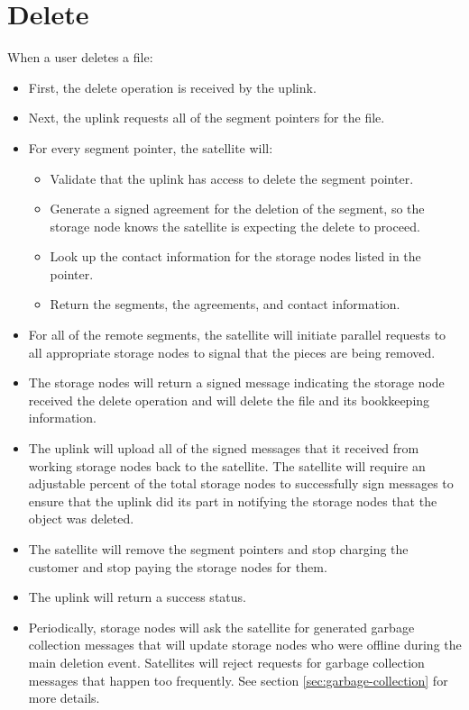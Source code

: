 \documentclass[11pt,fleqn,openany]{book}
\begin{document}
\section{Delete}

When a user deletes a file:

\begin{itemize}
\item First, the delete operation is received by the uplink.
\item Next, the uplink requests all of the segment pointers for the file.
\item For every segment pointer, the satellite will:
  \begin{itemize}
  \item Validate that the uplink has access to delete the segment pointer.
  \item Generate a signed agreement for the deletion of the segment, so the
    storage node knows the satellite is expecting the delete to proceed.
  \item Look up the contact information for the storage nodes listed in the
  pointer.
  \item Return the segments, the agreements, and contact information.
  \end{itemize}
\item For all of the remote segments, the satellite will
  initiate parallel requests to all appropriate storage nodes to signal that the
  pieces are being removed.
\item The storage nodes will return a signed message indicating the storage node
received the 
delete operation and will delete the file and its bookkeeping information.
\item The uplink will upload all of the signed messages that it received from
  working storage nodes back to the satellite. The satellite will require an
  adjustable percent of the total storage nodes to successfully sign messages
  to ensure that the uplink did its part in notifying the storage nodes that the
  object was deleted.
\item The satellite will remove the segment pointers and stop charging the
  customer and stop paying the storage nodes for them.
\item The uplink will return a success status.
\item Periodically, storage nodes will ask the satellite for generated garbage
  collection messages that will update storage nodes who were offline during the
  main deletion event.
  Satellites will reject requests for garbage collection messages that
  happen too frequently. See section \ref{sec:garbage-collection} for more
  details.
\end{itemize}
\end{document}

